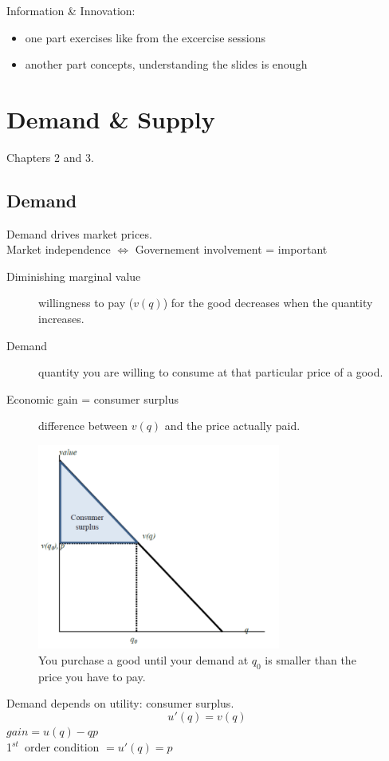 \documentclass[12pt, a4paper, titlepage]{extarticle}
\begin{document}
	Information \& Innovation:
	\begin{itemize}
	\item one part exercises like from the excercise sessions
	\item another  part concepts, understanding the slides is enough
	\end{itemize}
	
	\pagebreak
	\section{Demand \& Supply}
	Chapters 2 and 3.
	\subsection{Demand}
	
	Demand drives market prices.\\
	Market independence $\Leftrightarrow$ Governement involvement = important\\
	
	\begin{description}
		\item[Diminishing marginal value] willingness to pay ($v(q)$) for the good decreases when the quantity increases.
		\item[Demand] quantity you are willing to consume at that particular price of a good.
		\item[Economic gain = consumer surplus] difference between $v(q)$ and the price actually paid. 
	\end{description}
	
	\begin{figure}[h]
	\centering
		\includegraphics[width=8cm]{consumersurplus}
		\caption{You purchase a good until your demand at $q_0$ is smaller than the price you have to pay.\label{imgConsumerSurplus}}
	\end{figure}
	Demand depends on utility: consumer surplus.\\
	\[u'(q) = v(q) \]
	$gain = u(q) - qp$ \\
	1$^{st}$\ order condition $= u'(q) = p$\\
	
\end{document}
